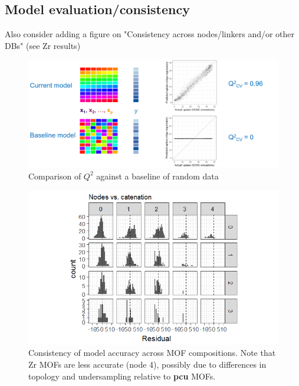 \documentclass[letterpaper]{article}
\begin{document}
\subsection{Model evaluation/consistency}

Also consider adding a figure on "Consistency across nodes/linkers and/or other DBs" (see Zr results)

\begin{figure}[!ht]
	\centering
	\includegraphics[width=0.75\columnwidth]{Figs/random_baseline.png}
	\caption{Comparison of $Q^2$ against a baseline of random data}
	\label{fig:q2_baseline}
\end{figure}

\begin{figure}[!ht]
	\centering
	\includegraphics[width=0.75\columnwidth]{Figs/consistency_across_compositions.png}
	\caption{Consistency of model accuracy across MOF compositions.  Note that Zr MOFs are less accurate (node 4), possibly due to differences in topology and undersampling relative to \textbf{pcu} MOFs.}
	\label{fig:nodes_vs_cat}
\end{figure}
\end{document}
